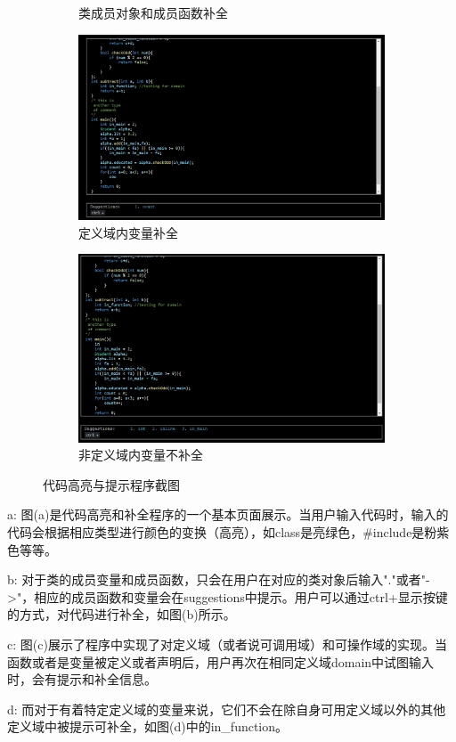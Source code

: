 \begin{figure}[h!]
\begin{subfigure}{0.45\linewidth}
        \caption{类成员对象和成员函数补全}
        \label{fig:2}
    \end{subfigure}
    \begin{subfigure}{0.45\textwidth}
        \centering
        \includegraphics[width=\linewidth]{imgs/定义域内变量补全.png}
        \caption{定义域内变量补全}
        \label{fig:3}
    \end{subfigure}
    \hspace{1em}
    \begin{subfigure}{0.45\linewidth}
        \centering
        \includegraphics[width=\linewidth]{imgs/非定义域内变量（in_function）不补全.png}
        \caption{非定义域内变量不补全}
        \label{fig:4}
    \end{subfigure}
    \caption{代码高亮与提示程序截图}
\end{figure}

a: 图(a)是代码高亮和补全程序的一个基本页面展示。当用户输入代码时，输入的代码会根据相应类型进行颜色的变换（高亮），如class是亮绿色，#include是粉紫色等等。

b: 对于类的成员变量和成员函数，只会在用户在对应的类对象后输入"."或者"->"，相应的成员函数和变量会在suggestions中提示。用户可以通过ctrl+显示按键的方式，对代码进行补全，如图(b)所示。

c: 图(c)展示了程序中实现了对定义域（或者说可调用域）和可操作域的实现。当函数或者是变量被定义或者声明后，用户再次在相同定义域domain中试图输入时，会有提示和补全信息。


d: 而对于有着特定定义域的变量来说，它们不会在除自身可用定义域以外的其他定义域中被提示可补全，如图(d)中的in_function。